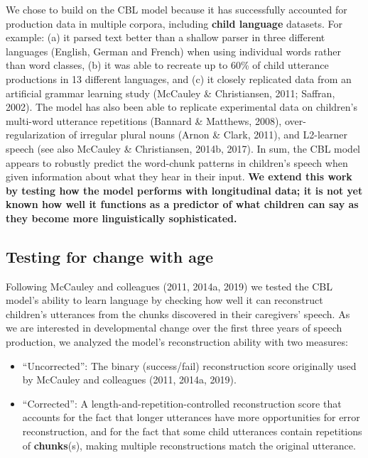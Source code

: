 \documentclass[man,mask,floatsintext]{apa6}
\providecommand{\tightlist}{%
  \setlength{\itemsep}{0pt}\setlength{\parskip}{0pt}}
\begin{document}
We chose to build on the CBL model because it has successfully accounted
for production data in multiple corpora, including \textbf{child
language} datasets. For example: (a) it parsed text better than a
shallow parser in three different languages (English, German and French)
when using individual words rather than word classes, (b) it was able to
recreate up to 60\% of child utterance productions in 13 different
languages, and (c) it closely replicated data from an artificial grammar
learning study (McCauley \& Christiansen, 2011; Saffran, 2002). The
model has also been able to replicate experimental data on children's
multi-word utterance repetitions (Bannard \& Matthews, 2008),
over-regularization of irregular plural nouns (Arnon \& Clark, 2011),
and L2-learner speech (see also McCauley \& Christiansen, 2014b, 2017).
In sum, the CBL model appears to robustly predict the word-chunk
patterns in children's speech when given information about what they
hear in their input. \textbf{We extend this work by testing how the
model performs with longitudinal data; it is not yet known how well it
functions as a predictor of what children can say as they become more
linguistically sophisticated.}

\subsection{Testing for change with
age}\label{testing-for-change-with-age}

Following McCauley and colleagues (2011, 2014a, 2019) we tested the CBL
model's ability to learn language by checking how well it can
reconstruct children's utterances from the chunks discovered in their
caregivers' speech. As we are interested in developmental change over
the first three years of speech production, we analyzed the model's
reconstruction ability with two measures:

\begin{itemize}
\tightlist
\item
  \enquote{Uncorrected}: The binary (success/fail) reconstruction score
  originally used by McCauley and colleagues (2011, 2014a, 2019).
\item
  \enquote{Corrected}: A length-and-repetition-controlled reconstruction
  score that accounts for the fact that longer utterances have more
  opportunities for error reconstruction, and for the fact that some
  child utterances contain repetitions of \textbf{chunks}(s), making
  multiple reconstructions match the original utterance.
\end{itemize}
\end{document}
